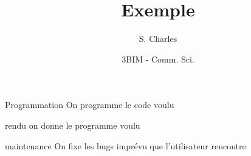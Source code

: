 \documentclass[10pt]{beamer}
\title[Exemple]{Exemple}
\author[S. Charles] {S. Charles}
\institute[UCB Lyon 1]{UCB Lyon 1}
\date[3BIM - INSA] {3BIM - Comm. Sci.}
\begin{document}
\frame{\titlepage}

\begin{frame}
\begin{block}{Programmation}
On programme le code voulu
\end{block}
\begin{block}{rendu}
on donne le programme voulu
\end{block}
\begin{block}{maintenance}
On fixe les bugs imprévu que l'utilisateur rencontre
\end{block}
\end{frame}
\end{document}
